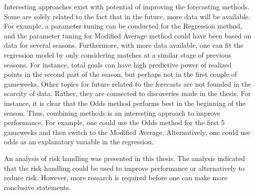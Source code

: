 Interesting approaches exist with potential of improving the forecasting methods. Some are solely related to the fact that in the future, more data will be available. For example, a parameter tuning can be conducted for the Regression method, and the parameter tuning for Modified Average method could have been based on data for several seasons. Furthermore, with more data available, one can fit the regression model by only considering matches at a similar stage of previous seasons. For instance, total goals can have high predictive power of realized points in the second part of the season, but perhaps not in the first couple of gameweeks. Other topics for future related to the forecasts are not founded in the scarcity of data. Rather, they are connected to discoveries made in the thesis. For instance, it is clear that the Odds method performs best in the beginning of the season. Thus, combining methods is an interesting approach to improve performance. For example, one could use the Odds method for the first 5 gameweeks and then switch to the Modified Average. Alternatively, one could use odds as an explanatory variable in the regression.

\newpar

An analysis of risk handling was presented in this thesis. The analysis indicated that the risk handling could be used to improve performance or alternatively to reduce risk. However, more research is required before one can make more conclusive statements. 

\begin{comment}
Furthermore,  is possible. In addition, as regression is a data dependent method it would have been interesting to see the results of regression variables tuned on a bigger data set. For the Odds method, it is difficult to say that something different could have been done considering the restrictions on data from Sportsradar. However, ideally it would have been interesting to have odds for future gameweeks such that the sub-horizon could have been set to higher than 1. A parameter tuning on this method would also be interesting. Furthermore, a parameter tuning taking account for gamechips or variance is also an interesting topic.

\newpar

The findings in this thesis are hard to generalize as they are tested on only on data for one season. Nevertheless, the results imply that there is potential to obtain high performance with a mathematical model and it can be competitive against human FPL managers. Because of the limitation of data and its constraints, it would be interesting to use the data of 2017/2018 season to enhance the solution framework presented in this thesis in order to see if it yields higher performance for next year's Fantasy Premier League. 


\end{comment}

